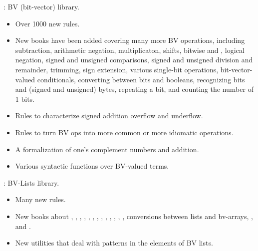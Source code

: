 \begin{frame}

\implibtitle

:
BV (bit-vector) library.
\begin{itemize}
\item Over 1000 new rules.
\item New books have been added covering many more BV operations,
including subtraction, arithmetic negation, multiplicaton, shifts,
bitwise  and , logical negation, signed and
unsigned comparisons, signed and unsigned division and remainder,
trimming, sign extension, various single-bit operations,
bit-vector-valued conditionals, converting between bits and booleans,
recognizing bits and (signed and unsigned) bytes, repeating a bit, and
counting the number of 1 bits.
\item Rules to characterize signed addition overflow and underflow.
\item Rules to turn BV ops into more common or more idiomatic operations.
\item A formalization of one's complement numbers and addition.
\item Various syntactic functions over BV-valued terms.
\end{itemize}

\end{frame}


\begin{frame}

\implibtitle

:
BV-Lists library.

\begin{itemize}
\item Many new rules.
\item New books about , ,
, ,
, , ,
, , ,
, , ,
conversions between lists and bv-arrays, , and
.
\item New utilities that deal with patterns in the elements of BV lists.
\end{itemize}

\end{frame}

